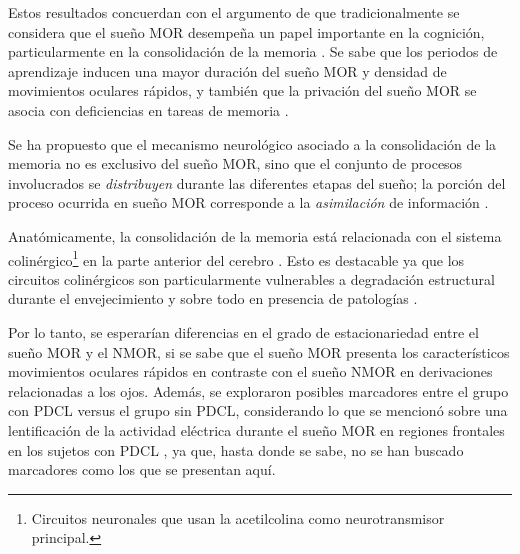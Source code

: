 \documentclass[12pt,letterpaper]{book}
\begin{document}
Estos resultados concuerdan con el argumento de que tradicionalmente se considera que el sueño MOR desempeña un papel importante en la cognición, particularmente en la consolidación de la memoria \cite{Corsi1983}.
%
Se sabe que los periodos de aprendizaje inducen una mayor duración del sueño MOR y densidad de movimientos oculares rápidos, y también que la privación del sueño MOR se asocia con deficiencias en tareas de memoria \cite{smith96,smith01}.

Se ha propuesto que el mecanismo neurológico asociado a la consolidación de la memoria no es exclusivo del sueño MOR, sino que el conjunto de procesos involucrados se \textit{distribuyen} durante las diferentes etapas del sueño; la porción del proceso ocurrida en sueño MOR corresponde a la \textit{asimilación} de información \cite{diekelmann10}.

Anatómicamente, la consolidación de la memoria está relacionada con el sistema colinérgico\footnote{Circuitos neuronales que usan la acetilcolina como neurotransmisor principal.} en la parte anterior del cerebro \cite{Blake}.
%
Esto es destacable ya que los circuitos colinérgicos son particularmente vulnerables a degradación estructural durante el envejecimiento y sobre todo en presencia de patologías \cite{Schliebs11}.

Por lo tanto, se esperarían diferencias en el grado de estacionariedad entre el sueño MOR y el NMOR, si se sabe que el sueño MOR presenta los característicos movimientos oculares rápidos en contraste con el sueño NMOR en derivaciones relacionadas a los ojos. Además, se exploraron posibles marcadores entre el grupo con PDCL versus el grupo sin PDCL, considerando lo que se mencionó sobre una lentificación de la actividad eléctrica durante el sueño MOR en regiones frontales en los sujetos con PDCL \cite{Brayet16}, ya que, hasta donde se sabe, no se han buscado marcadores como los que se presentan aquí.
%
\end{document}
